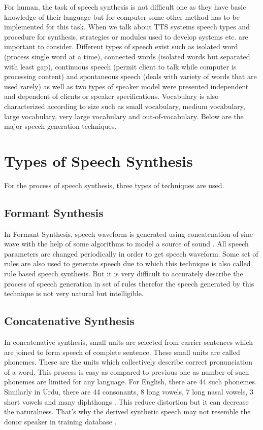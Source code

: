 For human, the task of speech synthesis is not difficult one as they have basic knowledge of their
language but for computer some other method has to be implemented for this task. When we talk about TTS systems speech types
and procedure for synthesis, strategies or modules used to develop systems etc. are important to
consider. Different types of speech exist such as isolated word (process single word at a time),
connected words (isolated words but separated with least gap), continuous speech (permit client
to talk while computer is processing content) and spontaneous speech (deals with variety of words
that are used rarely) as well as two types of speaker model were presented independent and
dependent of clients or speaker specifications. Vocabulary is also characterized according to size
such as small vocabulary, medium vocabulary, large vocabulary, very large vocabulary and out-of-vocabulary.
Below are the major speech generation techniques.

\section{Types of Speech Synthesis}
For the process of speech synthesis, three types of techniques are used.

\subsection{Formant Synthesis}
In Formant Synthesis, speech waveform is generated using concatenation of sine wave with the help of some algorithms to model a source of sound \cite{format_synthesis}. All speech parameters are changed periodically in order to get speech waveform. Some set of rules are also used to generate speech due to which this technique is also called rule based speech synthesis. But it is very difficult to accurately describe the process of speech generation in set of rules therefor the speech generated by this technique is not very natural but intelligible.

\subsection{Concatenative Synthesis}
In concatenative synthesis, small units are selected from carrier sentences which are joined to form
speech of complete sentence. These small units are called phonemes. These are the units which
collectively describe correct pronunciation of a word. This process is easy as compared to previous one
as number of such phonemes are limited for any language. For English, there are 44 such phonemes.
Similarly in Urdu, there are 44 consonants, 8 long vowels, 7 long nasal vowels, 3 short vowels and many
diphthongs \cite{saleem2002urdu}. This reduce distortion but it can decrease the naturalness.
That’s why the derived synthetic speech may not resemble the donor speaker in training database \cite{huang1996whistler}.

